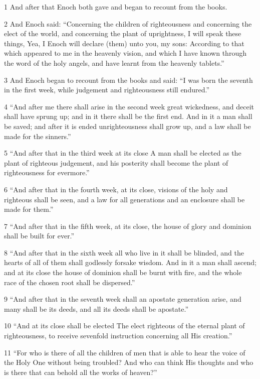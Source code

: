 \par 1 And after that Enoch both gave and began to recount from the books.
\par 2 And Enoch said: “Concerning the children of righteousness and concerning the elect of the world, and concerning the plant of uprightness, I will speak these things, Yea, I Enoch will declare (them) unto you, my sons: According to that which appeared to me in the heavenly vision, and which I have known through the word of the holy angels, and have learnt from the heavenly tablets.”
\par 3 And Enoch began to recount from the books and said: “I was born the seventh in the first week, while judgement and righteousness still endured.”
\par 4 “And after me there shall arise in the second week great wickedness, and deceit shall have sprung up; and in it there shall be the first end. And in it a man shall be saved; and after it is ended unrighteousness shall grow up, and a law shall be made for the sinners.”
\par 5 “And after that in the third week at its close A man shall be elected as the plant of righteous judgement, and his posterity shall become the plant of righteousness for evermore.”
\par 6 “And after that in the fourth week, at its close, visions of the holy and righteous shall be seen, and a law for all generations and an enclosure shall be made for them.”
\par 7 “And after that in the fifth week, at its close, the house of glory and dominion shall be built for ever.”
\par 8 “And after that in the sixth week all who live in it shall be blinded, and the hearts of all of them shall godlessly forsake wisdom. And in it a man shall ascend; and at its close the house of dominion shall be burnt with fire, and the whole race of the chosen root shall be dispersed.”
\par 9 “And after that in the seventh week shall an apostate generation arise, and many shall be its deeds, and all its deeds shall be apostate.”
\par 10 “And at its close shall be elected The elect righteous of the eternal plant of righteousness, to receive sevenfold instruction concerning all His creation.”
\par 11 “For who is there of all the children of men that is able to hear the voice of the Holy One without being troubled? And who can think His thoughts and who is there that can behold all the works of heaven?”
